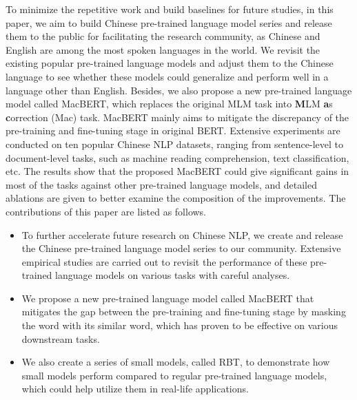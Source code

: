 \documentclass[journal]{IEEEtran}
\begin{document}
\begin{CJK*}{UTF8}{gbsn}
To minimize the repetitive work and build baselines for future studies, in this paper, we aim to build Chinese pre-trained language model series and release them to the public for facilitating the research community, as Chinese and English are among the most spoken languages in the world.
We revisit the existing popular pre-trained language models and adjust them to the Chinese language to see whether these models could generalize and perform well in a language other than English.
Besides, we also propose a new pre-trained language model called MacBERT, which replaces the original MLM task into {\bf M}LM {\bf a}s {\bf c}orrection (Mac) task.
MacBERT mainly aims to mitigate the discrepancy of the pre-training and fine-tuning stage in original BERT.
Extensive experiments are conducted on ten popular Chinese NLP datasets, ranging from sentence-level to document-level tasks, such as machine reading comprehension, text classification, etc.
The results show that the proposed MacBERT could give significant gains in most of the tasks against other pre-trained language models, and detailed ablations are given to better examine the composition of the improvements.
The contributions of this paper are listed as follows.

\begin{itemize}
	\item To further accelerate future research on Chinese NLP, we create and release the Chinese pre-trained language model series to our community. Extensive empirical studies are carried out to revisit the performance of these pre-trained language models on various tasks with careful analyses.
	\item We propose a new pre-trained language model called MacBERT that mitigates the gap between the pre-training and fine-tuning stage by masking the word with its similar word, which has proven to be effective on various downstream tasks.
	\item We also create a series of small models, called RBT, to demonstrate how small models perform compared to regular pre-trained language models, which could help utilize them in real-life applications.
\end{itemize}



\end{CJK*}
\end{document}

